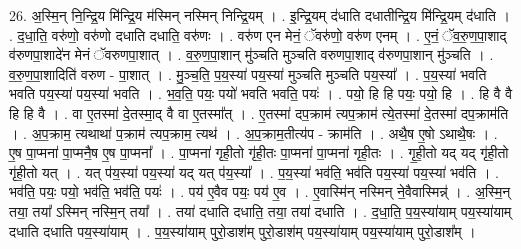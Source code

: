 \documentclass[17pt]{extarticle}
\begin{document}
26. अ॒स्मि॒न् नि॒न्द्रि॒य मि॑न्द्रि॒य म॑स्मिन् नस्मिन् निन्द्रि॒यम् । . इ॒न्द्रि॒यम् द॑धाति दधातीन्द्रि॒य मि॑न्द्रि॒यम् द॑धाति । . द॒धा॒ति॒ वरु॑णो॒ वरु॑णो दधाति दधाति॒ वरु॑णः । . वरु॑ण एन मेनं॒ ॅवरु॑णो॒ वरु॑ण एनम् । . ए॒नं॒ ॅव॒रु॒ण॒पा॒शाद् व॑रुणपा॒शादे॑न मेनं ॅवरुणपा॒शात् । . व॒रु॒ण॒पा॒शान् मु॑ञ्चति मुञ्चति वरुणपा॒शाद् व॑रुणपा॒शान् मु॑ञ्चति । . व॒रु॒ण॒पा॒शादिति॑ वरुण - पा॒शात् । . मु॒ञ्च॒ति॒ प॒य॒स्या॑ पय॒स्या॑ मुञ्चति मुञ्चति पय॒स्या᳚ । . प॒य॒स्या॑ भवति भवति पय॒स्या॑ पय॒स्या॑ भवति । . भ॒व॒ति॒ पयः॒ पयो॑ भवति भवति॒ पयः॑ । . पयो॒ हि हि पयः॒ पयो॒ हि । . हि वै वै हि हि वै । . वा ए॒तस्मा॑ दे॒तस्मा॒द् वै वा ए॒तस्मा᳚त् । . ए॒तस्मा॑ दप॒क्राम॑ त्यप॒क्राम॑ त्ये॒तस्मा॑ दे॒तस्मा॑ दप॒क्राम॑ति । . अ॒प॒क्राम॒ त्यथाथा॑ प॒क्राम॑ त्यप॒क्राम॒ त्यथ॑ । . अ॒प॒क्राम॒तीत्य॑प - क्राम॑ति । . अथै॒ष ए॒षो ऽथाथै॒षः । . ए॒ष पा॒प्मना॑ पा॒प्मनै॒ष ए॒ष पा॒प्मना᳚ । . पा॒प्मना॑ गृही॒तो गृ॑ही॒तः पा॒प्मना॑ पा॒प्मना॑ गृही॒तः । . गृ॒ही॒तो यद् यद् गृ॑ही॒तो गृ॑ही॒तो यत् । . यत् प॑य॒स्या॑ पय॒स्या॑ यद् यत् प॑य॒स्या᳚ । . प॒य॒स्या॑ भव॑ति॒ भव॑ति पय॒स्या॑ पय॒स्या॑ भव॑ति । . भव॑ति॒ पयः॒ पयो॒ भव॑ति॒ भव॑ति॒ पयः॑ । . पय॑ ए॒वैव पयः॒ पय॑ ए॒व । . ए॒वास्मि॑न् नस्मिन् ने॒वैवास्मिन्न्॑ । . अ॒स्मि॒न् तया॒ तया᳚ ऽस्मिन् नस्मि॒न् तया᳚ । . तया॑ दधाति दधाति॒ तया॒ तया॑ दधाति । . द॒धा॒ति॒ प॒य॒स्या॑याम् पय॒स्या॑याम् दधाति दधाति पय॒स्या॑याम् । . प॒य॒स्या॑याम् पुरो॒डाश॑म् पुरो॒डाश॑म् पय॒स्या॑याम् पय॒स्या॑याम् पुरो॒डाश᳚म् । \newline
\end{document}

